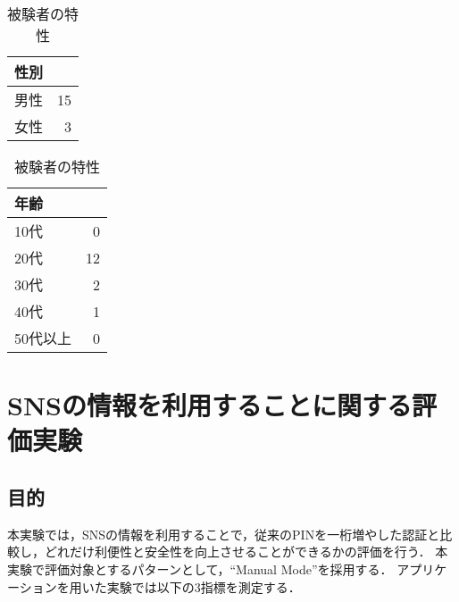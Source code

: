 \begin{table}[ht]
  \begin{minipage}{0.5\hsize}
    \begin{center}
      \small
      \begin{tabular}{l|r} \hline
        性別 \\ \hline
        男性 & 15 \\
        女性 & 3 \\ \hline
      \end{tabular}
    \end{center}
  \end{minipage}
  \begin{minipage}{0.5\hsize}
    \begin{center}
      \small
      \begin{tabular}{l|r} \hline
        年齢  \\ \hline
        10代 & 0 \\
        20代 & 12 \\
        30代 & 2 \\
        40代 & 1 \\
        50代以上 & 0 \\ \hline
      \end{tabular}
    \end{center}
  \end{minipage}
  \caption{被験者の特性}
  \label{tab:participants}
\end{table}

\section{SNSの情報を利用することに関する評価実験}\label{sec:vsTweet}
\subsection{目的}
本実験では，SNSの情報を利用することで，従来のPINを一桁増やした認証と比較し，どれだけ利便性と安全性を向上させることができるかの評価を行う．
本実験で評価対象とするパターンとして，``Manual Mode''を採用する．
アプリケーションを用いた実験では以下の3指標を測定する．

